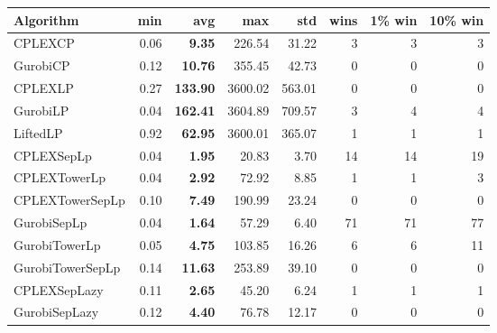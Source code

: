 \begin{tabular}{lrrrrrrr}
Algorithm & min & avg & max & std
& wins & 1\% win & 10\% win 
\\
\hline
CPLEXCP&0.06& \bf9.35& 226.54& 31.22&3&3&3\\
GurobiCP&0.12& \bf10.76& 355.45& 42.73&0&0&0\\
CPLEXLP&0.27& \bf133.90& 3600.02& 563.01&0&0&0\\
GurobiLP&0.04& \bf162.41& 3604.89& 709.57&3&4&4\\
LiftedLP&0.92& \bf62.95& 3600.01& 365.07&1&1&1\\
CPLEXSepLp&0.04& \bf1.95& 20.83& 3.70&14&14&19\\
CPLEXTowerLp&0.04& \bf2.92& 72.92& 8.85&1&1&3\\
CPLEXTowerSepLp&0.10& \bf7.49& 190.99& 23.24&0&0&0\\
GurobiSepLp&0.04& \bf1.64& 57.29& 6.40&71&71&77\\
GurobiTowerLp&0.05& \bf4.75& 103.85& 16.26&6&6&11\\
GurobiTowerSepLp&0.14& \bf11.63& 253.89& 39.10&0&0&0\\
CPLEXSepLazy&0.11& \bf2.65& 45.20& 6.24&1&1&1\\
GurobiSepLazy&0.12& \bf4.40& 76.78& 12.17&0&0&0
\end{tabular}
